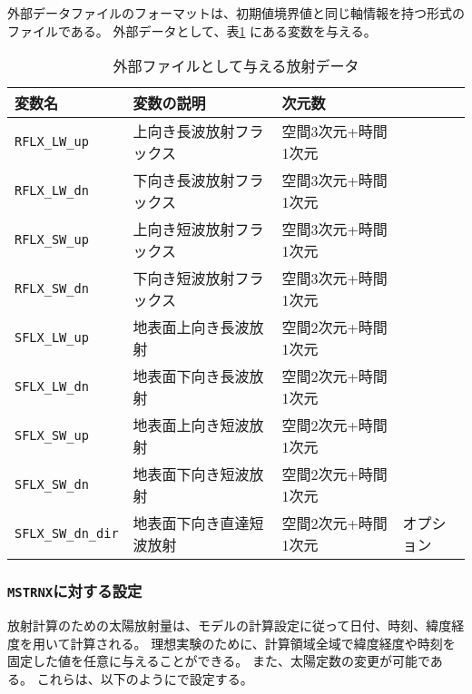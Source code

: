 \noindent
外部データファイルのフォーマットは、初期値境界値と同じ軸情報を持つ{\netcdf}形式のファイルである。
外部データとして、表\ref{tab:var_list_atm_rd_offline} にある変数を与える。
\begin{table}[h]
\begin{center}
  \caption{外部ファイルとして与える放射データ}
  \label{tab:var_list_atm_rd_offline}
  \begin{tabularx}{150mm}{lXll} \hline
    \rowcolor[gray]{0.9}  変数名 & 変数の説明 & 次元数 & \\ \hline
      \verb|RFLX_LW_up|     & 上向き長波放射フラックス & 空間3次元+時間1次元 \\
      \verb|RFLX_LW_dn|     & 下向き長波放射フラックス & 空間3次元+時間1次元 \\
      \verb|RFLX_SW_up|     & 上向き短波放射フラックス & 空間3次元+時間1次元 \\
      \verb|RFLX_SW_dn|     & 下向き短波放射フラックス & 空間3次元+時間1次元 \\
      \verb|SFLX_LW_up|     & 地表面上向き長波放射　　 & 空間2次元+時間1次元 \\
      \verb|SFLX_LW_dn|     & 地表面下向き長波放射　　 & 空間2次元+時間1次元 \\
      \verb|SFLX_SW_up|     & 地表面上向き短波放射　　 & 空間2次元+時間1次元 \\
      \verb|SFLX_SW_dn|     & 地表面下向き短波放射　　 & 空間2次元+時間1次元 \\
      \verb|SFLX_SW_dn_dir| & 地表面下向き直達短波放射 & 空間2次元+時間1次元 & オプション \\
    \hline
  \end{tabularx}
\end{center}
\end{table}


\subsubsection{\texttt{MSTRNX}に対する設定}

放射計算のための太陽放射量は、モデルの計算設定に従って日付、時刻、緯度経度を用いて計算される。
理想実験のために、計算領域全域で緯度経度や時刻を固定した値を任意に与えることができる。
また、太陽定数の変更が可能である。
これらは、以下のようにで設定する。

